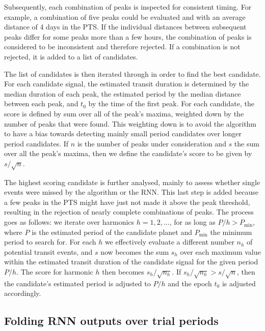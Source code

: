 Subsequently, each combination of peaks is inspected for consistent timing. For example, a combination of five peaks could be evaluated and with an average distance of 4 days in the PTS. If the individual distances between subsequent peaks differ for some peaks more than a few hours, the combination of peaks is considered to be inconsistent and therefore rejected. If a combination is not rejected, it is added to a list of candidates.

The list of candidates is then iterated through in order to find the best candidate. For each candidate signal, the estimated transit duration is determined by the median duration of each peak, the estimated period by the median distance between each peak, and $t_0$ by the time of the first peak. For each candidate, the score is defined by sum over all of the peak's maxima, weighted down by the number of peaks that were found. This weighting down is to avoid the algorithm to have a bias towards detecting mainly small period candidates over longer period candidates. If $n$ is the number of peaks under consideration and $s$ the sum over all the peak's maxima, then we define the candidate's score to be given by $s / \sqrt{n}$.

The highest scoring candidate is further analysed, mainly to assess whether single events were missed by the algorithm or the RNN. This last step is added because a few peaks in the PTS might have just not made it above the peak threshold, resulting in the rejection of nearly complete combinations of peaks. The process goes as follows: we iterate over harmonics $h = 1, 2, \dots$, for as long as $P/h > P_{\text{min}}$, where $P$ is the estimated period of the candidate planet and $P_{\text{min}}$ the minimum period to search for. For each $h$ we effectively evaluate a different number $n_h$ of potential transit events, and $s$ now becomes the sum $s_h$ over each maximum value within the estimated transit duration of the candidate signal for the given period $P/h$. The score for harmonic $h$ then becomes $s_h / \sqrt{n_h}$. If $s_h / \sqrt{n_h} > s / \sqrt{n}$, then the candidate's estimated period is adjusted to $P/h$ and the epoch $t_0$ is adjusted accordingly.

 

\subsection{Folding RNN outputs over trial periods}
\label{sec:alg_folding}

